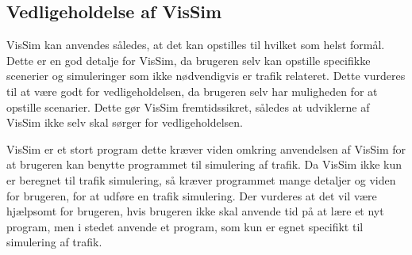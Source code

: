 \subsection{Vedligeholdelse af VisSim}
VisSim kan anvendes således, at det kan opstilles til hvilket som helst formål. Dette er en god detalje for VisSim, da brugeren selv kan opstille specifikke scenerier og simuleringer som ikke nødvendigvis er trafik relateret. Dette vurderes til at være godt for vedligeholdelsen, da brugeren selv har muligheden for at opstille scenarier. Dette gør VisSim fremtidssikret, således at udviklerne af VisSim ikke selv skal sørger for vedligeholdelsen.

VisSim er et stort program dette kræver viden omkring anvendelsen af VisSim for at brugeren kan benytte programmet til simulering af trafik. Da VisSim ikke kun er beregnet til trafik simulering, så kræver programmet mange detaljer og viden for brugeren, for at udføre en trafik simulering. Der vurderes at det vil være hjælpsomt for brugeren, hvis brugeren ikke skal anvende tid på at lære et nyt program, men i stedet anvende et program, som kun er egnet specifikt til simulering af trafik. 



